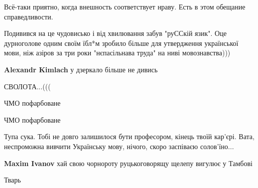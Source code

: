 \begin{itemize}
Всё-таки приятно, когда внешность соответствует нраву. Есть в этом обещание справедливости.


Подивився на це чудовисько і від хвилювання забув "руССкій
язик". Оце дурноголове одним своїм їбл*м зробило більше для утвердження української мови, ніж азіров за три роки "нєпасільнава труда" на ниві мовознавства)))

\begin{itemize}

\textbf{Alexandr Kimlach} у дзеркало більше не дивись
\end{itemize}


СВОЛОТА...(((


ЧМО пофарбоване


ЧМО пофарбоване


Тупа сука. Тобі не довго залишилося бути професором, кінець твоїй кар'єрі. Вата, неспроможна вивчити Українську мову, нічого, скоро заспіваєю солов'їно...

\begin{itemize}

\textbf{Maxim Ivanov} хай свою чорнороту руцькоговорящу щелепу вигулює у Тамбові
\end{itemize}


Тварь


\end{itemize}
